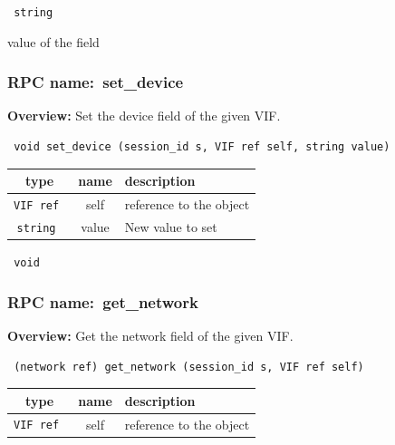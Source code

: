 {\tt 
string
}


value of the field
\vspace{0.3cm}
\vspace{0.3cm}
\vspace{0.3cm}
\subsubsection{RPC name:~set\_device}

{\bf Overview:} 
Set the device field of the given VIF.

\begin{verbatim} void set_device (session_id s, VIF ref self, string value)\end{verbatim}



 
\vspace{0.3cm}
\begin{tabular}{|c|c|p{7cm}|}
 \hline
{\bf type} & {\bf name} & {\bf description} \\ \hline
{\tt VIF ref } & self & reference to the object \\ \hline 

{\tt string } & value & New value to set \\ \hline 

\end{tabular}

\vspace{0.3cm}

{\tt 
void
}



\vspace{0.3cm}
\vspace{0.3cm}
\vspace{0.3cm}
\subsubsection{RPC name:~get\_network}

{\bf Overview:} 
Get the network field of the given VIF.

\begin{verbatim} (network ref) get_network (session_id s, VIF ref self)\end{verbatim}



 
\vspace{0.3cm}
\begin{tabular}{|c|c|p{7cm}|}
 \hline
{\bf type} & {\bf name} & {\bf description} \\ \hline
{\tt VIF ref } & self & reference to the object \\ \hline 

\end{tabular}

